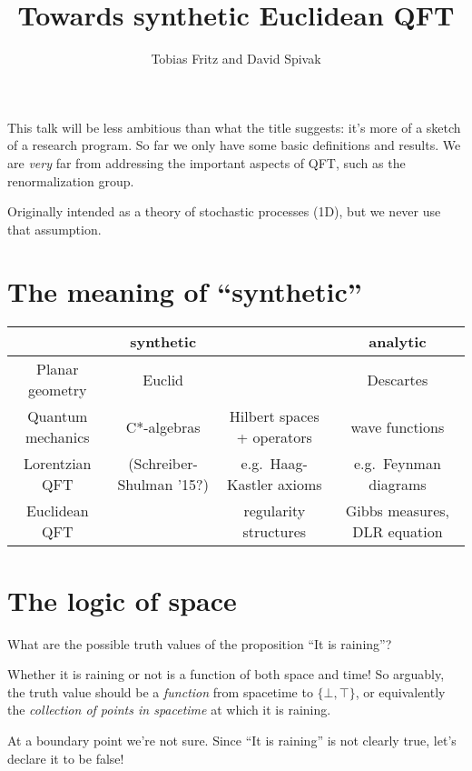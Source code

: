 \documentclass[11pt, oneside, article]{memoir}
\theoremstyle{plain}
\theoremstyle{definition}
\theoremstyle{remark}
\begin{document}
\title{Towards synthetic Euclidean QFT}

\author{Tobias Fritz and David Spivak}

\maketitle



This talk will be less ambitious than what the title suggests: it's more of a sketch of a research program. So far we only have some basic definitions and results. We are \emph{very} far from addressing the important aspects of QFT, such as the renormalization group.

Originally intended as a theory of stochastic processes (1D), but we never use that assumption.

\chapter{The meaning of ``synthetic''}

\begin{center}
\begin{tabular}{c|c|c|c}
& synthetic & & analytic \\\hline\hline
Planar geometry & Euclid & & Descartes \\\hline
Quantum mechanics & C*-algebras & Hilbert spaces + operators & wave functions \\\hline
Lorentzian QFT & (Schreiber-Shulman '15?) & e.g.~Haag-Kastler axioms & e.g.~Feynman diagrams \\\hline
Euclidean QFT & \fbox{\fbox{??}} & regularity structures & Gibbs measures, DLR equation
\end{tabular}
\end{center}

\chapter{The logic of space}

What are the possible truth values of the proposition ``It is raining''?

Whether it is raining or not is a function of both space and time! So arguably, the truth value should be a \emph{function} from spacetime to $\{\bot,\top\}$, or equivalently the \emph{collection of points in spacetime} at which it is raining. 

At a boundary point we're not sure. Since ``It is raining'' is not clearly true, let's declare it to be false!
\end{document}
